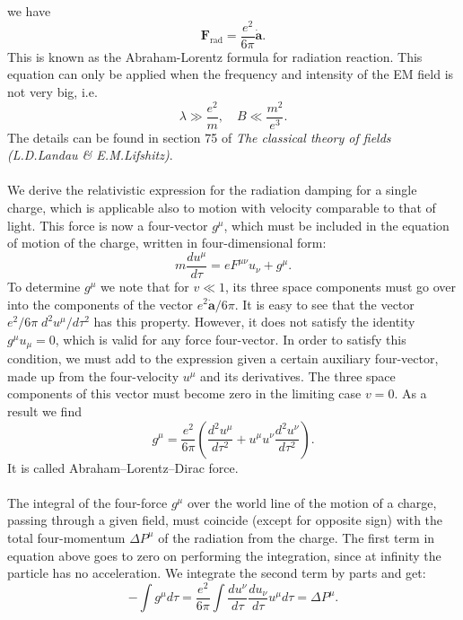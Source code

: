 we have
\[\bm{F}_{\mathrm{rad}} = \frac{e^2}{6\pi} \dot{\bm{a}}.\]
This is known as the Abraham-Lorentz formula for radiation reaction. This equation can only be applied when the frequency and intensity of the EM field is not very big, i.e.
\[\lambda \gg \frac{e^2}{m} , \quad B \ll \frac{m^2}{e^3}.\]
The details can be found in section 75 of \emph{The classical theory of fields (L.D.Landau \& E.M.Lifshitz)}.
\\ \\
We derive the relativistic expression for the radiation damping for a single charge, which is applicable also to motion with velocity comparable to that of light. This force is now a four-vector $g^{\mu}$, which must be included in the equation of motion of the charge, written in four-dimensional form:
\[m\frac{du^{\mu}}{d\tau} = eF^{\mu\nu}u_{\nu} + g^{\mu}.\]
To determine $g^{\mu}$ we note that for $v \ll 1$, its three space components must go over into the components of the vector ${e^2 \dot{\bm{a}}}/{6\pi}$. 
It is easy to see that the vector ${e^2}/{6\pi} \; {d^2u^{\mu}}/{d\tau^2}$ has this property. However, it does not satisfy the identity $g^{\mu}u_{\mu} = 0$, which is valid for any force four-vector. 
In order to satisfy this condition, we must add to the expression given a certain auxiliary four-vector, made up from the four-velocity $u^{\mu}$ and its derivatives. 
The three space components of this vector must become zero in the limiting case $v = 0$. As a result we find
\[g^{\mu} = \frac{e^2}{6\pi} \left( \frac{d^2u^{\mu}}{d\tau^2} + u^{\mu}u^{\nu}\frac{d^2u^{\nu}}{d\tau^2} \right).\]
It is called Abraham–Lorentz–Dirac force.
\\ \\
The integral of the four-force $g^{\mu}$ over the world line of the motion of a charge, passing through a given field, must coincide (except for opposite sign) with the total four-momentum $\Delta P^{\mu}$ of the radiation from the charge. 
The first term in equation above goes to zero on performing the integration, since at infinity the particle has no acceleration. We integrate the second term by parts and get:
\[-\int g^{\mu} d\tau = \frac{e^2}{6\pi} \int \frac{du^{\nu}}{d\tau} \frac{du_{\nu}}{d\tau} u^{\mu}d\tau = \Delta P^{\mu}.\]

